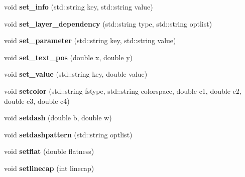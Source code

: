 \begin{DoxyCompactItemize}
\item 
\hypertarget{classPDFlib_a1679bc2cdc767964fe19993032704c65}{void {\bfseries set\-\_\-info} (std\-::string key, std\-::string value)}\label{classPDFlib_a1679bc2cdc767964fe19993032704c65}

\item 
\hypertarget{classPDFlib_a3bf3c45ea844c50c81d1e6d1a399f7cf}{void {\bfseries set\-\_\-layer\-\_\-dependency} (std\-::string type, std\-::string optlist)}\label{classPDFlib_a3bf3c45ea844c50c81d1e6d1a399f7cf}

\item 
\hypertarget{classPDFlib_abced8a3b9223a00e6a9fbf13aa2cf488}{void {\bfseries set\-\_\-parameter} (std\-::string key, std\-::string value)}\label{classPDFlib_abced8a3b9223a00e6a9fbf13aa2cf488}

\item 
\hypertarget{classPDFlib_a68aaa2b104cbeff66f28478c5503b71c}{void {\bfseries set\-\_\-text\-\_\-pos} (double x, double y)}\label{classPDFlib_a68aaa2b104cbeff66f28478c5503b71c}

\item 
\hypertarget{classPDFlib_a5fbc3e6d8843291ada8fabe40a106caf}{void {\bfseries set\-\_\-value} (std\-::string key, double value)}\label{classPDFlib_a5fbc3e6d8843291ada8fabe40a106caf}

\item 
\hypertarget{classPDFlib_a45fca2a5dce286baa78e2394d83baa6f}{void {\bfseries setcolor} (std\-::string fstype, std\-::string colorspace, double c1, double c2, double c3, double c4)}\label{classPDFlib_a45fca2a5dce286baa78e2394d83baa6f}

\item 
\hypertarget{classPDFlib_a45e9138f953e972ab2f09f076d105c7b}{void {\bfseries setdash} (double b, double w)}\label{classPDFlib_a45e9138f953e972ab2f09f076d105c7b}

\item 
\hypertarget{classPDFlib_a54c49fec034612feaf38fad5df9f76b7}{void {\bfseries setdashpattern} (std\-::string optlist)}\label{classPDFlib_a54c49fec034612feaf38fad5df9f76b7}

\item 
\hypertarget{classPDFlib_a305e47f39351bc587c78c90cc4edabba}{void {\bfseries setflat} (double flatness)}\label{classPDFlib_a305e47f39351bc587c78c90cc4edabba}

\item 
\hypertarget{classPDFlib_a60623dfccc99a7fd09b12c9b585092db}{void {\bfseries setlinecap} (int linecap)}\label{classPDFlib_a60623dfccc99a7fd09b12c9b585092db}


\end{DoxyCompactItemize}
